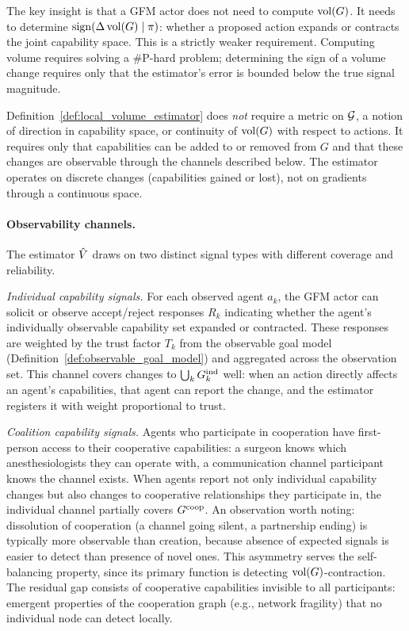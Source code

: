 The key insight is that a GFM actor does not need to compute $\operatorname{vol}(G)$. It
needs to determine $\operatorname{sign}(\Delta \operatorname{vol}(G) \mid \pi)$: whether a proposed action
expands or contracts the joint capability space. This is a strictly weaker
requirement. Computing volume requires solving a \#P-hard problem; determining
the sign of a volume change requires only that the estimator's error is bounded
below the true signal magnitude.

Definition~\ref{def:local_volume_estimator} does \emph{not} require a metric on
$\mathcal{G}$, a notion of direction in capability space, or continuity of $\operatorname{vol}(G)$
with respect to actions. It requires only that capabilities can be added to or
removed from $G$ and that these changes are observable through the channels
described below. The estimator operates on discrete changes (capabilities
gained or lost), not on gradients through a continuous space.

\paragraph{Observability channels.} The estimator $\hat{V}$ draws on two distinct
signal types with different coverage and reliability.

\emph{Individual capability signals.} For each observed agent $a_k$, the GFM
actor can solicit or observe accept/reject responses $R_k$ indicating whether
the agent's individually observable capability set expanded or contracted.
These responses are weighted by the trust factor $T_k$ from the observable goal
model (Definition~\ref{def:observable_goal_model}) and aggregated across the
observation set. This channel covers changes to $\bigcup_k G_{k}^{\mathrm{ind}}$ well: when
an action directly affects an agent's capabilities, that agent can report the
change, and the estimator registers it with weight proportional to trust.

\emph{Coalition capability signals.} Agents who participate in cooperation
have first-person access to their cooperative capabilities: a surgeon knows
which anesthesiologists they can operate with, a communication channel
participant knows the channel exists. When agents report not only individual
capability changes but also changes to cooperative relationships they
participate in, the individual channel partially covers $G^{\mathrm{coop}}$. An
observation worth noting: dissolution of cooperation (a channel going silent,
a partnership ending) is typically more observable than creation, because
absence of expected signals is easier to detect than presence of novel ones.
This asymmetry serves the self-balancing property, since its primary function
is detecting $\operatorname{vol}(G)$-contraction. The residual gap consists of cooperative
capabilities invisible to all participants: emergent properties of the
cooperation graph (e.g., network fragility) that no individual node can detect
locally.

